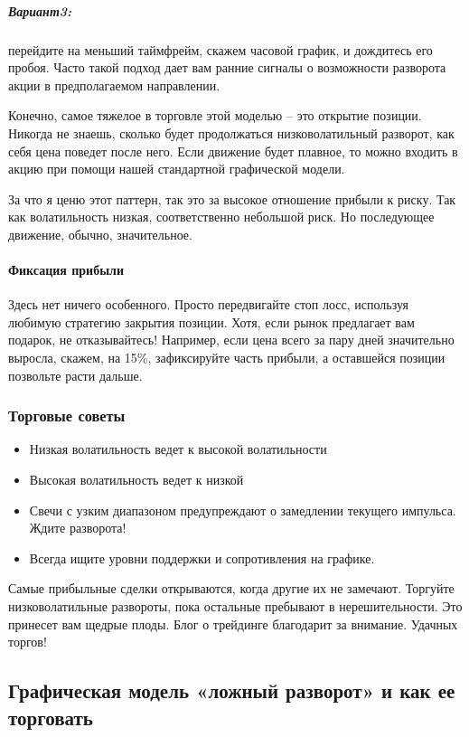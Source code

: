 \documentclass{book}
\begin{document}
\subparagraph{Вариант3:} перейдите на меньший таймфрейм, скажем часовой график, и дождитесь его пробоя. Часто такой подход дает вам ранние сигналы о возможности разворота акции в предполагаемом направлении.

Конечно, самое тяжелое в торговле этой моделью – это открытие позиции. Никогда не знаешь, сколько будет продолжаться низковолатильный разворот, как себя цена поведет после него. Если движение будет плавное, то можно входить в акцию при помощи нашей стандартной графической модели.

За что я ценю этот паттерн, так это за высокое отношение прибыли к
риску. Так как волатильность низкая, соответственно небольшой риск. Но
последующее движение, обычно, значительное.

\paragraph{Фиксация прибыли}

Здесь нет ничего особенного. Просто передвигайте стоп лосс, используя любимую стратегию закрытия позиции. Хотя, если рынок предлагает вам подарок, не отказывайтесь! Например, если цена всего за пару дней значительно выросла, скажем, на 15\%, зафиксируйте часть прибыли, а оставшейся позиции позвольте расти дальше.

\subsubsection{Торговые советы}
\begin{itemize}
\item     Низкая волатильность ведет к высокой волатильности
\item     Высокая волатильность ведет к низкой
\item     Свечи с узким диапазоном предупреждают о замедлении текущего импульса. Ждите разворота!
\item     Всегда ищите уровни поддержки и сопротивления на графике.
\end{itemize}

Самые прибыльные сделки открываются, когда другие их не замечают. Торгуйте низковолатильные развороты, пока остальные пребывают в нерешительности. Это принесет вам щедрые плоды. Блог о трейдинге благодарит за внимание. Удачных торгов!

\subsection{Графическая модель «ложный разворот» и как ее торговать}
\end{document}
